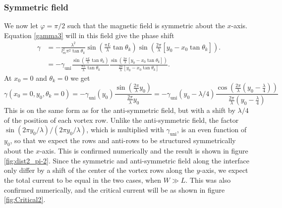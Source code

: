 \subsubsection{Symmetric field}
We now let $\varphi =\pi/2$ such that the magnetic field is symmetric about the $x$-axis. Equation \eqref{gamma3} will in this field give the phase shift
\begin{equation}
\begin{split}
    \gamma &= -\frac{\lambda^2}{l_m^2\pi^2\tan\theta_k}\sin\left(\frac{\pi L}{\lambda}\tan\theta_k\right)\sin\left(\frac{2\pi}{\lambda}\left[y_0-x_0\tan\theta_k\right]\right). 
    \\
    &= -\gamma_{\mathrm{uni}}\frac{\sin\left(\frac{\pi L}{\lambda}\tan\theta_k\right)}{\frac{\pi L}{\lambda}\tan\theta_k}\frac{\sin\left(\frac{2\pi}{\lambda}\left[y_0-x_0\tan\theta_k\right]\right)}{\frac{2\pi}{\lambda}\left[y_0-x_0\tan\theta_k\right]}.
\end{split}
\end{equation}
At $x_0=0$ and $\theta_k = 0$ we get
\begin{equation}
    \gamma(x_0=0,y_0,\theta_k=0) = -\gamma_{\mathrm{uni}}(y_0)\frac{\sin\left(\frac{2\pi}{\lambda}y_0\right)}{\frac{2\pi}{\lambda}y_0} = -\gamma_{\mathrm{uni}}(y_0-\lambda/4)\frac{\cos\left(\frac{2\pi}{\lambda}\left(y_0-\frac{\lambda}{4}\right)\right)}{\frac{2\pi}{\lambda}\left(y_0-\frac{\lambda}{4}\right)}
\end{equation}
This is on the same form as for the anti-symmetric field, but with a shift by $\lambda/4$ of the position of each vortex row. Unlike the anti-symmetric field, the factor $\sin(2\pi y_0/\lambda)/(2\pi y_0 /\lambda)$, which is multiplied with $\gamma_{\mathrm{uni}}$, is an even function of $y_0$, so that we expect the rows and anti-rows to be structured symmetrically about the $x$-axis. This is confirmed numerically and the result is shown in figure \ref{fig:dist2_pi-2}. Since the symmetric and anti-symmetric field along the interface only differ by a shift of the center of the vortex rows along the $y$-axis, we expect the total current to be equal in the two cases, when $W \gg L$. This was also confirmed numerically, and the critical current will be as shown in figure \ref{fig:Critical2}.
